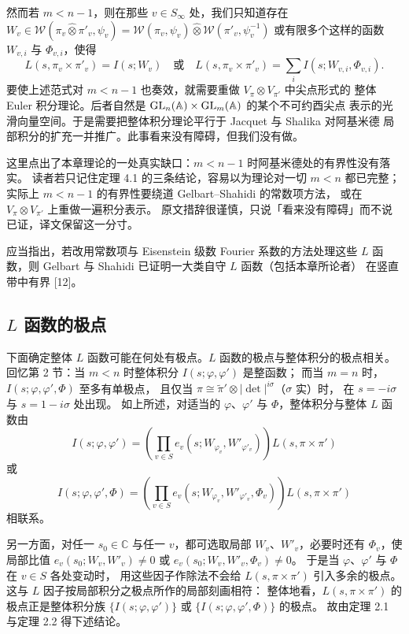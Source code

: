 然而若 $m<n-1$，则在那些 $v\in S_\infty$ 处，我们只知道存在
$W_v\in\mathcal{W}(\pi_v\widehat{\otimes}\pi'_v,\psi_v)
=\mathcal{W}(\pi_v,\psi_v)\widehat{\otimes}\mathcal{W}(\pi'_v,\psi_v^{-1})$
或有限多个这样的函数 $W_{v,i}$ 与 $\Phi_{v,i}$，使得
\[
L(s,\pi_v\times\pi'_v)=I(s;W_v)
\quad\text{或}\quad
L(s,\pi_v\times\pi'_v)=\sum_iI(s;W_{v,i},\Phi_{v,i}).
\]
要使上述范式对 $m<n-1$ 也奏效，就需要重做 $V_\pi\otimes V_{\pi'}$ 中尖点形式的
整体 Euler 积分理论。后者自然是 $\mathrm{GL}_n(\mathbb{A})\times\mathrm{GL}_m(\mathbb{A})$ 的某个不可约酉尖点
表示的光滑向量空间。于是需要把整体积分理论平行于 Jacquet 与 Shalika 对阿基米德
局部积分的扩充一并推广。此事看来没有障碍，但我们没有做。
\begin{annote}
这里点出了本章理论的一处真实缺口：$m<n-1$ 时阿基米德处的有界性没有落实。
读者若只记住定理 4.1 的三条结论，容易以为理论对一切 $m<n$ 都已完整；
实际上 $m<n-1$ 的有界性要绕道 Gelbart--Shahidi 的常数项方法，
或在 $V_\pi\otimes V_{\pi'}$ 上重做一遍积分表示。
原文措辞很谨慎，只说「看来没有障碍」而不说已证，译文保留这一分寸。
\par{}
\end{annote}

应当指出，若改用常数项与 Eisenstein 级数 Fourier 系数的方法处理这些
$L$ 函数，则 Gelbart 与 Shahidi 已证明一大类自守 $L$ 函数（包括本章所论者）
在竖直带中有界 [12]。

\subsection{\texorpdfstring{$L$}{L} 函数的极点}

下面确定整体 $L$ 函数可能在何处有极点。$L$ 函数的极点与整体积分的极点相关。
回忆第 2 节：当 $m<n$ 时整体积分 $I(s;\varphi,\varphi')$ 是整函数；
而当 $m=n$ 时，$I(s;\varphi,\varphi',\Phi)$ 至多有单极点，
且仅当 $\pi\cong\widetilde{\pi}'\otimes|\det|^{i\sigma}$（$\sigma$ 实）时，
在 $s=-i\sigma$ 与 $s=1-i\sigma$ 处出现。
如上所述，对适当的 $\varphi$、$\varphi'$ 与 $\Phi$，整体积分与整体 $L$ 函数由
\[
I(s;\varphi,\varphi')=\left(\prod_{v\in S}e_v(s;W_{\varphi_v},W'_{\varphi'_v})\right)
L(s,\pi\times\pi')
\]
或
\[
I(s;\varphi,\varphi',\Phi)
=\left(\prod_{v\in S}e_v(s;W_{\varphi_v},W'_{\varphi'_v},\Phi_v)\right)
L(s,\pi\times\pi')
\]
相联系。

另一方面，对任一 $s_0\in\mathbb{C}$ 与任一 $v$，都可选取局部
$W_v$、$W'_v$，必要时还有 $\Phi_v$，使局部比值
$e_v(s_0;W_v,W'_v)\neq0$ 或 $e_v(s_0;W_v,W'_v,\Phi_v)\neq0$。
于是当 $\varphi$、$\varphi'$ 与 $\Phi$ 在 $v\in S$ 各处变动时，
用这些因子作除法不会给 $L(s,\pi\times\pi')$ 引入多余的极点。
这与 $L$ 因子按局部积分之极点所作的局部刻画相符：
整体地看，$L(s,\pi\times\pi')$ 的极点正是整体积分族
$\{I(s;\varphi,\varphi')\}$ 或 $\{I(s;\varphi,\varphi',\Phi)\}$ 的极点。
故由定理 2.1 与定理 2.2 得下述结论。

